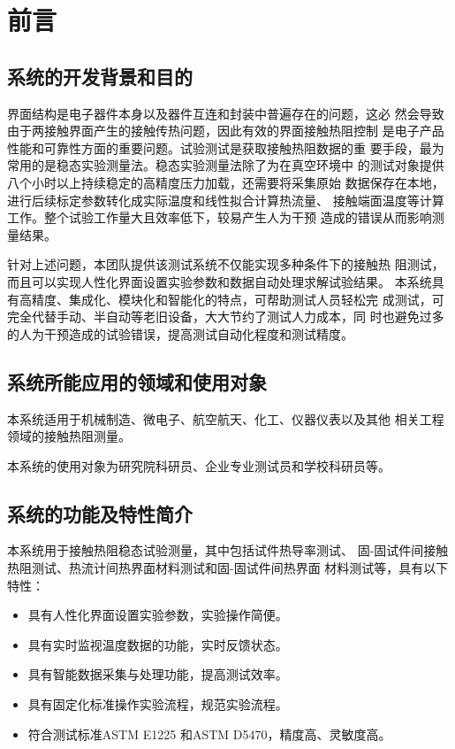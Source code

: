 \chapter{前言}
\section{系统的开发背景和目的}
\par 界面结构是电子器件本身以及器件互连和封装中普遍存在的问题，这必
然会导致由于两接触界面产生的接触传热问题，因此有效的界面接触热阻控制
是电子产品性能和可靠性方面的重要问题。试验测试是获取接触热阻数据的重
要手段，最为常用的是稳态实验测量法。稳态实验测量法除了为在真空环境中
的测试对象提供八个小时以上持续稳定的高精度压力加载，还需要将采集原始
数据保存在本地，进行后续标定参数转化成实际温度和线性拟合计算热流量、
接触端面温度等计算工作。整个试验工作量大且效率低下，较易产生人为干预
造成的错误从而影响测量结果。
\par 针对上述问题，本团队提供该测试系统不仅能实现多种条件下的接触热
阻测试，而且可以实现人性化界面设置实验参数和数据自动处理求解试验结果。
本系统具有高精度、集成化、模块化和智能化的特点，可帮助测试人员轻松完
成测试，可完全代替手动、半自动等老旧设备，大大节约了测试人力成本，同
时也避免过多的人为干预造成的试验错误，提高测试自动化程度和测试精度。

\section{系统所能应用的领域和使用对象}
\par 本系统适用于机械制造、微电子、航空航天、化工、仪器仪表以及其他
相关工程领域的接触热阻测量。
\par 本系统的使用对象为研究院科研员、企业专业测试员和学校科研员等。

\section{系统的功能及特性简介}
\par 本系统用于接触热阻稳态试验测量，其中包括试件热导率测试、
固-固试件间接触热阻测试、热流计间热界面材料测试和固-固试件间热界面
材料测试等，具有以下特性：
\begin{itemize}
    \item 具有人性化界面设置实验参数，实验操作简便。
    \item 具有实时监视温度数据的功能，实时反馈状态。
    \item 具有智能数据采集与处理功能，提高测试效率。
    \item 具有固定化标准操作实验流程，规范实验流程。
    \item 符合测试标准ASTM E1225 和ASTM D5470，精度高、灵敏度高。
\end{itemize}
